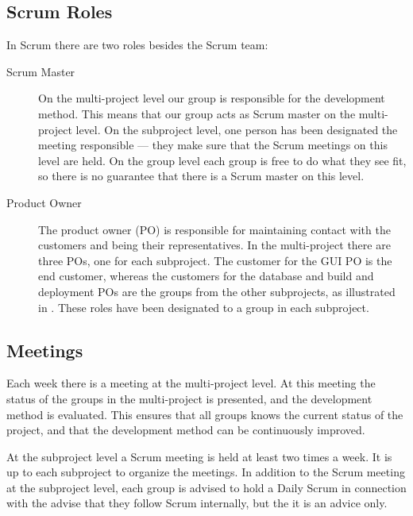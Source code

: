 \subsection{Scrum Roles}
In Scrum there are two roles besides the Scrum team:

\begin{description}
  \item[Scrum Master] On the multi-project level our group is responsible for the development method. This means that our group acts as Scrum master on the multi-project level. On the subproject level, one person has been designated the meeting responsible --- they make sure that the Scrum meetings on this level are held. On the group level each group is free to do what they see fit, so there is no guarantee that there is a Scrum master on this level.
  \item[Product Owner] The product owner (PO) is responsible for maintaining contact with the customers and being their representatives. In the multi-project there are three POs, one for each subproject. The customer for the GUI PO is the end customer, whereas the customers for the database and build and deployment POs are the groups from the other subprojects, as illustrated in . These roles have been designated to a group in each subproject.
\end{description}


\subsection{Meetings}
Each week there is a meeting at the multi-project level. At this meeting the status of the groups in the multi-project is presented, and the development method is evaluated. This ensures that all groups knows the current status of the project, and that the development method can be continuously  improved.

At the subproject level a Scrum meeting is held at least two times a week. It is up to each subproject to organize the meetings. In addition to the Scrum meeting at the subproject level, each group is advised to hold a Daily Scrum in connection with the advise that they follow Scrum internally, but the it is an advice only.

